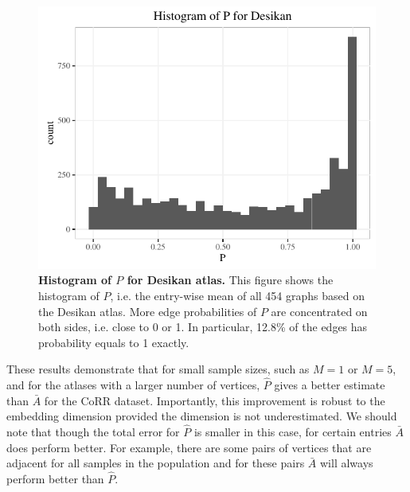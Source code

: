 \documentclass[10pt,letterpaper]{article}
\renewcommand{\hat}{\widehat}
\begin{document}
\begin{figure}[!htbp]
\centering
\includegraphics[width=1\textwidth]{P_hist_desikan.pdf}
\caption{{\bf Histogram of $P$ for Desikan atlas.}
This figure shows the histogram of $P$, i.e. the entry-wise mean of all 454 graphs based on the Desikan atlas. More edge probabilities of $P$ are concentrated on both sides, i.e. close to 0 or 1. In particular, 12.8\% of the edges has probability equals to 1 exactly.}
\label{fig:P_hist_desikan}
\end{figure}

These results demonstrate that for small sample sizes, such as $M=1$ or $M=5$, and for the atlases with a larger number of vertices, $\hat{P}$ gives a better estimate than $\bar{A}$ for the CoRR dataset.
Importantly, this improvement is robust to the embedding dimension provided the dimension is not underestimated.
We should note that though the total error for $\hat{P}$ is smaller in this case, for certain entries $\bar{A}$ does perform better.
For example, there are some pairs of vertices that are adjacent for all samples in the population and for these pairs $\bar{A}$ will always perform better than $\hat{P}$. 
\end{document}

